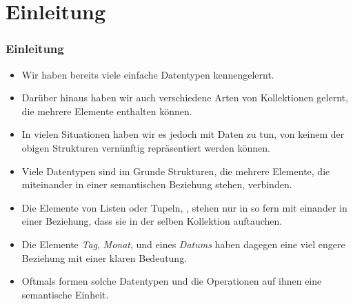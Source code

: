 \documentclass[aspectratio=169,mathserif,notheorems]{beamer}%
\subtitle{41.~Grundlagen von Klassen}%
\begin{document}
%
%
\startPresentation%
%
\section{Einleitung}%
\begin{frame}%
\frametitle{Einleitung}%
\begin{itemize}%
%
\item Wir haben bereits viele einfache Datentypen kennengelernt.%
%
\item<2-> Darüber hinaus haben wir auch verschiedene Arten von Kollektionen gelernt, die mehrere Elemente enthalten können.%
%
\item<3-> In vielen Situationen haben wir es jedoch mit Daten zu tun, von keinem der obigen Strukturen vernünftig repräsentiert werden können.%
%
\item<4-> Viele Datentypen sind im Grunde Strukturen, die mehrere Elemente, die miteinander in einer semantischen Beziehung stehen, verbinden.%
%
\item<5-> Die Elemente von Listen oder Tupeln, \DEzB, stehen nur in so fern mit einander in einer Beziehung, dass sie in der selben Kollektion auftauchen.%
%
\item<6-> Die Elemente \emph{Tag}, \emph{Monat}, und  eines \emph{Datums} haben dagegen eine viel engere Beziehung mit einer klaren Bedeutung.%
%
\item<7-> Oftmals formen solche Datentypen und die Operationen auf ihnen eine semantische Einheit.
\end{itemize}
\end{frame}%
%
\end{document}
